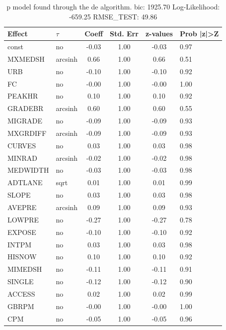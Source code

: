 \begin{table}
	\caption{p model found through the de algorithm. bic: 1925.70 Log-Likelihood: -659.25 RMSE_TEST: 49.86}
	\begin{center}
		\begin{tabular}{|l|l|c|c|c|l|}
			\hline
			Effect & $\tau$ & Coeff & Std. Err & z-values & Prob |z|>Z \\
			\hline
			const & no & -0.03 & 1.00 & -0.03 & 0.97 \\
			\hline
			MXMEDSH & arcsinh & 0.66 & 1.00 & 0.66 & 0.51 \\
			\hline
			URB & no & -0.10 & 1.00 & -0.10 & 0.92 \\
			\hline
			FC & no & -0.00 & 1.00 & -0.00 & 1.00 \\
			\hline
			PEAKHR & no & 0.10 & 1.00 & 0.10 & 0.92 \\
			\hline
			GRADEBR & arcsinh & 0.60 & 1.00 & 0.60 & 0.55 \\
			\hline
			MIGRADE & no & -0.09 & 1.00 & -0.09 & 0.93 \\
			\hline
			MXGRDIFF & arcsinh & -0.09 & 1.00 & -0.09 & 0.93 \\
			\hline
			CURVES & no & 0.03 & 1.00 & 0.03 & 0.98 \\
			\hline
			MINRAD & arcsinh & -0.02 & 1.00 & -0.02 & 0.98 \\
			\hline
			MEDWIDTH & no & -0.03 & 1.00 & -0.03 & 0.98 \\
			\hline
			ADTLANE & sqrt & 0.01 & 1.00 & 0.01 & 0.99 \\
			\hline
			SLOPE & no & 0.03 & 1.00 & 0.03 & 0.98 \\
			\hline
			AVEPRE & arcsinh & 0.09 & 1.00 & 0.09 & 0.93 \\
			\hline
			LOWPRE & no & -0.27 & 1.00 & -0.27 & 0.78 \\
			\hline
			EXPOSE & no & -0.10 & 1.00 & -0.10 & 0.92 \\
			\hline
			INTPM & no & 0.03 & 1.00 & 0.03 & 0.98 \\
			\hline
			HISNOW & no & 0.10 & 1.00 & 0.10 & 0.92 \\
			\hline
			MIMEDSH & no & -0.11 & 1.00 & -0.11 & 0.91 \\
			\hline
			SINGLE & no & -0.12 & 1.00 & -0.12 & 0.90 \\
			\hline
			ACCESS & no & 0.02 & 1.00 & 0.02 & 0.99 \\
			\hline
			GBRPM & no & -0.00 & 1.00 & -0.00 & 1.00 \\
			\hline
			CPM & no & -0.05 & 1.00 & -0.05 & 0.96 \\

\end{tabular}
\end{center}
\end{table}
